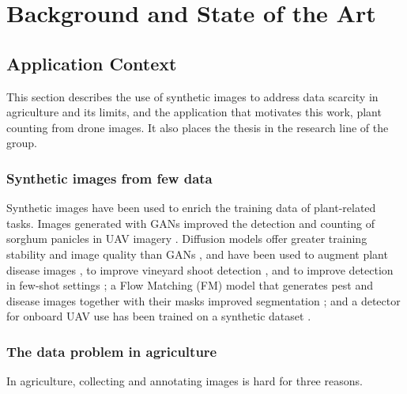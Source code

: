 \renewcommand{\baselinestretch}{1.5}

\chapter{Background and State of the Art}

\section{Application Context}

This section describes the use of synthetic images to address data scarcity in agriculture and its limits, and the application that motivates this work, plant counting from drone images. It also places the thesis in the research line of the group.

\subsection{Synthetic images from few data}

Synthetic images have been used to enrich the training data of plant-related tasks. Images generated with GANs improved the detection and counting of sorghum panicles in UAV imagery \cite{Cai2022}. Diffusion models offer greater training stability and image quality than GANs \cite{Hu2025}, and have been used to augment plant disease images \cite{Muhammad2023}, to improve vineyard shoot detection \cite{Hirahara2025}, and to improve detection in few-shot settings \cite{Fang2024}; a Flow Matching (FM) model that generates pest and disease images together with their masks improved segmentation \cite{Kong2026}; and a detector for onboard UAV use has been trained on a synthetic dataset \cite{Bernardo2023}.

\subsection{The data problem in agriculture}

In agriculture, collecting and annotating images is hard for three reasons.

